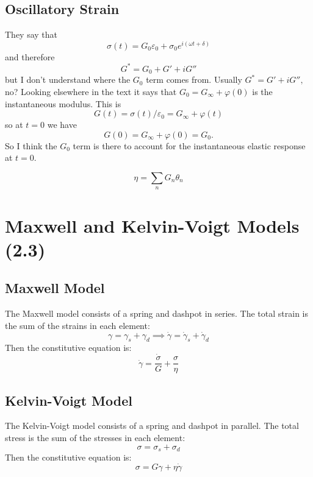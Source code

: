\subsection{Oscillatory Strain}
They say that
\[
	\sigma(t) = G_0 \varepsilon_0  + \sigma_0 e^{i(\omega t +\delta)}
\]
and therefore
\[
	G^* = G_0 + G' + iG''
\]
but I don't understand where the $G_0$ term comes from.
Usually
\(
	G^* =  G' + iG'',
\)
no?
Looking elsewhere in the text it says that $G_0 = G_\infty + \varphi(0)$ is the instantaneous modulus.
This is
\[
	G(t) = \sigma(t)/\varepsilon_0 = G_\infty + \varphi(t)
\]
so at $t=0$ we have
\[	G(0) = G_\infty + \varphi(0) = G_0. \]
So I think the $G_0$ term is there to account for the instantaneous elastic response at $t=0$.

\begin{equation}
	\eta = \sum_n G_n \theta_n
\end{equation}


\section{Maxwell and Kelvin-Voigt Models (2.3)}
\subsection{Maxwell Model}
The Maxwell model consists of a spring and dashpot in series.
The total strain is the sum of the strains in each element:
\begin{equation*}
	\gamma = \gamma_s + \gamma_d
	\implies
	\dot\gamma = \dot\gamma_s + \dot\gamma_d
\end{equation*}
Then the constitutive equation is:
\begin{equation}
	\dot\gamma = \frac{\dot\sigma}{G} + \frac{\sigma}{\eta}
	\label{eq:maxwell_constitutive}
\end{equation}

\subsection{Kelvin-Voigt Model}
The Kelvin-Voigt model consists of a spring and dashpot in parallel.
The total stress is the sum of the stresses in each element:
\begin{equation*}
	\sigma = \sigma_s + \sigma_d
\end{equation*}
Then the constitutive equation is:
\begin{equation}
	\sigma = G \gamma + \eta \dot\gamma
	\label{eq:kv_constitutive}
\end{equation}


